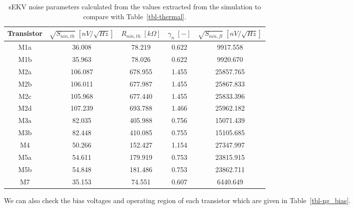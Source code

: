 \documentclass[
  a4paper,
  DIV=11,
  numbers=noendperiod]{scrreprt}
\begin{document}
\begin{longtable}[]{@{}ccccc@{}}

\caption{\label{tbl-ng_op6}sEKV noise parameters calculated from the
values extracted from the simulation to compare with
Table~\ref{tbl-thermal}.}

\tabularnewline

\toprule\noalign{}
Transistor & \(\sqrt{S_{nin,th}}\;[nV/\sqrt{Hz}]\) &
\(R_{nin,th}\;[k\Omega]\) & \(\gamma_n\;[-]\) &
\(\sqrt{S_{nin,fl}}\;[nV/\sqrt{Hz}]\) \\
\midrule\noalign{}
\endhead
\bottomrule\noalign{}
\endlastfoot
M1a & 36.008 & 78.219 & 0.622 & 9917.558 \\
M1b & 35.963 & 78.026 & 0.622 & 9920.670 \\
M2a & 106.087 & 678.955 & 1.455 & 25857.765 \\
M2b & 106.011 & 677.987 & 1.455 & 25867.833 \\
M2c & 105.968 & 677.440 & 1.455 & 25833.396 \\
M2d & 107.239 & 693.788 & 1.466 & 25962.182 \\
M3a & 82.035 & 405.988 & 0.756 & 15071.439 \\
M3b & 82.448 & 410.085 & 0.755 & 15105.685 \\
M4 & 50.266 & 152.427 & 1.154 & 27347.997 \\
M5a & 54.611 & 179.919 & 0.753 & 23815.915 \\
M5b & 54.848 & 181.486 & 0.753 & 23862.711 \\
M7 & 35.153 & 74.551 & 0.607 & 6440.649 \\

\end{longtable}

We can also check the bias voltages and operating region of each
transistor which are given in Table~\ref{tbl-ng_bias}.
\end{document}
